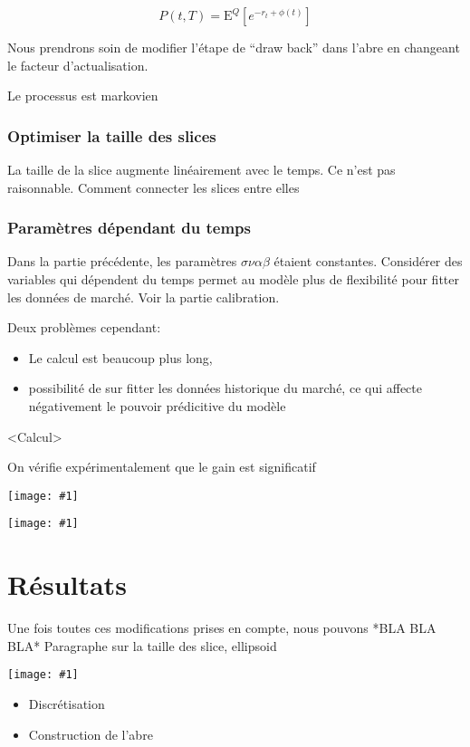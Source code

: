 \documentclass[paper=a4, fontsize=11pt]{scrartcl}
\numberwithin{equation}{section}		%
\numberwithin{figure}{section}			%
\numberwithin{table}{section}				%
\newcommand{\espr}[1]{
  \mathrm{E}^Q \left[ #1 \right]
}
\theoremstyle{definition}
\newcommand{\IMG}[3]{
  \begin{center}
    \texttt{[image: \#1]}%
    \end{center}
}
\begin{document}
$$P(t, T) = \espr{ e^{-r_t + \phi(t)}}$$

Nous prendrons soin de modifier l'étape de ``draw back'' dans l'abre en changeant le facteur d'actualisation.

Le processus est markovien

\subsubsection{Optimiser la taille des slices }
La taille de la slice augmente linéairement avec le temps. Ce n'est pas raisonnable.
Comment connecter les slices entre elles


\subsubsection{ Paramètres dépendant du temps}

Dans la partie précédente, les paramètres $\sigma \nu \alpha \beta$ étaient constantes. Considérer des variables qui dépendent  du temps permet au modèle plus de flexibilité pour fitter les données de marché. Voir la partie calibration.

Deux problèmes cependant:

\begin{itemize}
\item Le calcul est beaucoup plus long,
\item possibilité de sur fitter les données historique du marché, ce qui affecte négativement le pouvoir prédicitive du modèle
\end{itemize}

<Calcul>

On vérifie expérimentalement que le gain est significatif

\IMG{img/pending.jpg}{Cache grind avant}{0.2}
\IMG{img/pending.jpg}{Cache grind apres}{0.2}

\section{Résultats}

Une fois toutes ces modifications prises en compte, nous pouvons *BLA BLA BLA*
Paragraphe sur la taille des slice, ellipsoid
\IMG{img/pending.jpg}{Slice 2D}{0.2}


\begin{itemize}
\item Discrétisation
\item Construction de l'abre
\end{itemize}
\end{document}
